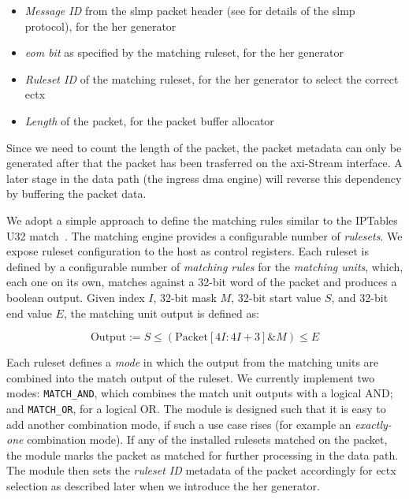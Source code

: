\begin{itemize}
    \item \emph{Message ID} from the \ac{slmp} packet header (see  for details of the \ac{slmp} protocol), for the \ac{her} generator
    \item \emph{\ac{eom} bit} as specified by the matching ruleset, for the \ac{her} generator
    \item \emph{Ruleset ID} of the matching ruleset, for the \ac{her} generator to select the correct \ac{ectx}
    \item \emph{Length} of the packet, for the packet buffer allocator
\end{itemize}

Since we need to count the length of the packet, the packet metadata can only be generated after that the packet has been trasferred on the \ac{axi}-Stream interface.  A later stage in the data path (the ingress \ac{dma} engine) will reverse this dependency by buffering the packet data.

We adopt a simple approach to define the matching rules similar to the IPTables U32 match~\cite{cohen_iptables_nodate}.  The matching engine provides a configurable number of \emph{rulesets}.  We expose ruleset configuration to the host as control registers.  Each ruleset is defined by a configurable number of \emph{matching rules} for the \emph{matching units}, which, each one on its own, matches against a 32-bit word of the packet and produces a boolean output.  Given index $I$, 32-bit mask $M$, 32-bit start value $S$, and 32-bit end value $E$, the matching unit output is defined as:

\[
\text{Output} := S \le (\text{Packet}[4I:4I+3] \mathbin{\&} M) \le E
\]

Each ruleset defines a \emph{mode} in which the output from the matching units are combined into the match output of the ruleset.  We currently implement two modes: \texttt{MATCH\_\-AND}, which combines the match unit outputs with a logical AND; and \texttt{MATCH\_\-OR}, for a logical OR.  The module is designed such that it is easy to add another combination mode, if such a use case rises (for example an \emph{exactly-one} combination mode).  If any of the installed rulesets matched on the packet, the module marks the packet as matched for further processing in the data path.  The module then sets the \emph{ruleset ID} metadata of the packet accordingly for \ac{ectx} selection as described later when we introduce the \ac{her} generator.

